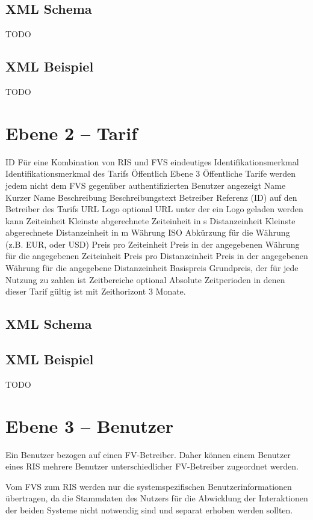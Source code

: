 \subsection{XML Schema}

TODO

\subsection{XML Beispiel}
TODO

\section{Ebene 2 -- Tarif}
ID		Für eine Kombination von RIS und FVS eindeutiges Identifikationsmerkmal Identifikationsmerkmal des Tarifs
Öffentlich	Ebene 3	Öffentliche Tarife werden jedem nicht dem FVS gegenüber authentifizierten Benutzer angezeigt
Name		Kurzer Name
Beschreibung		Beschreibungstext
Betreiber		Referenz (ID) auf den Betreiber des Tarifs
URL Logo	optional	URL unter der ein Logo geladen werden kann
Zeiteinheit		Kleinste abgerechnete Zeiteinheit in s
Distanzeinheit		Kleinste abgerechnete Distanzeinheit in m
Währung		ISO Abkürzung für die Währung (z.B. EUR, oder USD)
Preis pro Zeiteinheit		Preis in der angegebenen Währung für die angegebenen Zeiteinheit
Preis pro Distanzeinheit		Preis in der angegebenen Währung für die angegebene Distanzeinheit
Basispreis		Grundpreis, der für jede Nutzung zu zahlen ist
Zeitbereiche	optional	 Absolute Zeitperioden in denen dieser Tarif gültig ist mit Zeithorizont 3 Monate.

\subsection{XML Schema}


\subsection{XML Beispiel}
TODO

\section{Ebene 3 -- Benutzer}
Ein Benutzer bezogen auf einen FV-Betreiber. Daher können einem Benutzer eines RIS mehrere Benutzer unterschiedlicher FV-Betreiber zugeordnet werden.

Vom FVS zum RIS werden nur die systemspezifischen Benutzerinformationen übertragen, da die Stammdaten des Nutzers für die Abwicklung der Interaktionen der beiden Systeme nicht notwendig sind und separat erhoben werden sollten.

